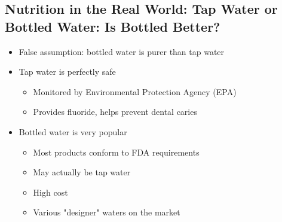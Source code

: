 \documentclass[12pt]{article}
\begin{document}
        \subsection{Nutrition in the Real World: Tap Water or Bottled Water: Is Bottled Better?}
            \begin{itemize}
                \item False assumption: bottled water is purer than tap water
                \item Tap water is perfectly safe
                    \begin{itemize}
                        \item Monitored by Environmental Protection Agency (EPA)
                        \item Provides fluoride, helps prevent dental caries
                    \end{itemize}
                \item Bottled water is very popular
                    \begin{itemize}
                        \item Most products conform to FDA requirements
                        \item May actually be tap water
                        \item High cost
                        \item Various "designer" waters on the market
                    \end{itemize}
            \end{itemize}
\end{document}
